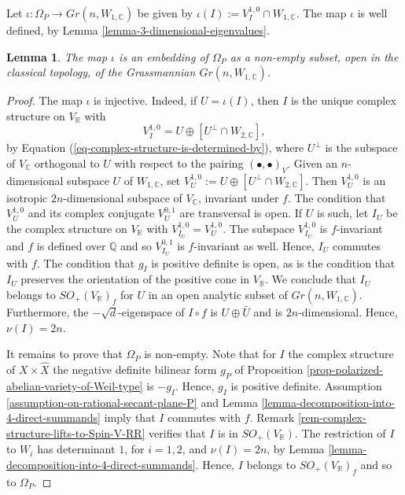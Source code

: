 \documentclass[12pt]{amsart}
\numberwithin{equation}{subsection}
\theoremstyle{plain}
\newtheorem{lem}[thm]{Lemma}
\theoremstyle{definition}
\newcommand{\CC}{{\mathbb C}}
\newcommand{\QQ}{{\mathbb Q}}
\newcommand{\RR}{{\mathbb R}}
\begin{document}
Let $\iota:\Omega_P\rightarrow Gr(n,W_{1,\CC})$ be given by $\iota(I):=V^{1,0}_I\cap W_{1,\CC}$.
The map $\iota$ is well defined, by Lemma \ref{lemma-3-dimensional-eigenvalues}.

\begin{lem}
\label{lemma-coadjoint-orbit-embedds-as-open-subset-of-Grassmannian}
The map $\iota$ is an embedding of $\Omega_P$ as a non-empty subset, open in the classical topology, of the Grassmannian $Gr(n,W_{1,\CC})$.
\end{lem}

\begin{proof}
The map $\iota$ is injective. Indeed,
if $U=\iota(I)$, then $I$ is the unique complex structure on $V_\RR$ with 
\[
V^{1,0}_I=U\oplus \left[U^\perp\cap W_{2,\CC}\right],
\]
by Equation (\ref{eq-complex-structure-is-determined-by}), where $U^\perp$ is the subspace of $V_\CC$ orthogonal to $U$ with respect to the pairing $(\bullet,\bullet)_V$. Given an $n$-dimensional subspace $U$ of
$W_{1,\CC}$, set $V^{1,0}_U:=U\oplus \left[U^\perp\cap W_{2,\CC}\right]$. 
Then $V^{1,0}_U$ is an isotropic $2n$-dimensional subspace of $V_\CC$, invariant under $f$.
The condition that $V^{1,0}_U$ and its complex conjugate $V^{0,1}_U$ are transversal is open. If $U$ is such, let $I_U$ be the complex structure on $V_\RR$ with $V^{1,0}_{I_U}=V^{1,0}_U$. The subspace $V^{1,0}_{I_U}$ is $f$-invariant and $f$ is defined over $\QQ$ and so $V^{0,1}_{I_U}$ is $f$-invariant as well. 
Hence, $I_U$ commutes with $f$. The condition that $g_I$ is positive definite is open, as is the condition 
that $I_U$ preserves the orientation of the positive cone in $V_\RR$.
We conclude that $I_U$ belongs to $SO_+(V_\RR)_f$ for $U$ in an open analytic subset of $Gr(n,W_{1,\CC})$. Furthermore, the $-\sqrt{d}$-eigenspace of $I\circ f$ is $U\oplus \bar{U}$ and is $2n$-dimensional. Hence, $\nu(I)=2n$.

It remains to prove that $\Omega_P$ is non-empty. Note that for $I$ the complex structure of $X\times \hat{X}$ the negative definite bilinear form $g_P$ of 
Proposition \ref{prop-polarized-abelian-variety-of-Weil-type} is $-g_I$. Hence, $g_I$ is positive definite. 
Assumption \ref{assumption-on-rational-secant-plane-P} and Lemma \ref{lemma-decomposition-into-4-direct-summands} imply that $I$ commutes with $f$.
Remark \ref{rem-complex-structure-lifts-to-Spin-V-RR} verifies that $I$ is in $SO_+(V_\RR)$. The restriction of $I$ to $W_i$ has determinant $1$, for $i=1,2$, 
and $\nu(I)=2n$, by Lemma \ref{lemma-decomposition-into-4-direct-summands}. Hence, $I$ belongs to $SO_+(V_\RR)_f$ and so to $\Omega_P$.
%
\end{proof}
\end{document}
